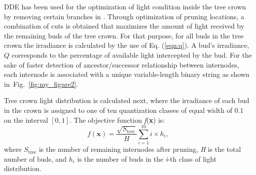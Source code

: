 DDE has
been used for the optimization of light condition inside the tree crown
by removing certain branches in \cite{strnad_novel_2017}.
Through optimization of pruning locations, a combination of cuts is obtained
that maximizes the amount of light received by the remaining buds of the
tree crown. For that purpose, for all buds in the tree crown the
irradiance is calculated by the use of Eq. (\ref{eqn:q}). A bud's irradiance, \(Q\)
corresponds to the percentage of available light intercepted by the bud.
For the sake of faster detection of ancestor/successor relationship
between internodes, each internode is associated with a unique
variable-length binary string as shown in~Fig.~\ref{fig:my_figure2}. 

Tree crown light
distribution is calculated next, where the irradiance of each bud in the crown is assigned to one of ten quantization classes of equal width of $0.1$ on
the interval $[0, 1]$. The objective function 
\emph{f}(\textbf{x}) is:
\begin{equation}
 f\left( \mathbf{x} \right) = \frac{\sqrt{S_{\mathrm{\text{tree}}}}}{H}\sum_{i = 1}^{10}{i \times h_{i}}, 
\end{equation}
where \(S_{\mathrm{\text{tree}}}\) is the number of remaining internodes
after pruning, \emph{H} is the total number of buds, and \(h_{i}\) is
the number of buds in the \emph{i}-th class of light distribution.

